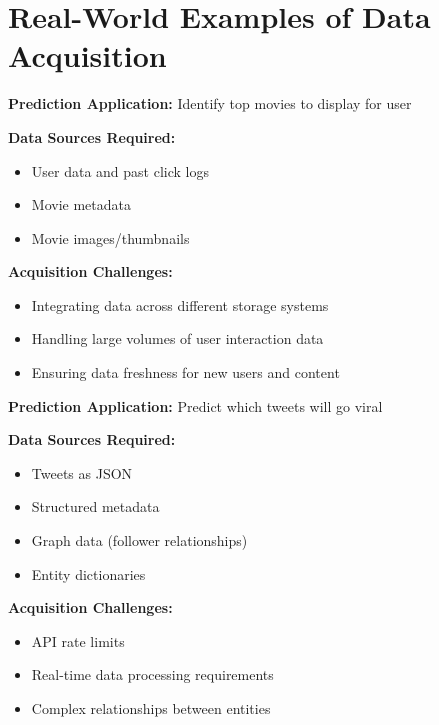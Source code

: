 \documentclass[12pt]{article}
\begin{document}
\section{Real-World Examples of Data Acquisition}

\begin{tcolorbox}[colback=blue!5!white,colframe=blue!75!black,title=Example: Recommendation System (e.g., Netflix)]
\textbf{Prediction Application:} Identify top movies to display for user

\textbf{Data Sources Required:}
\begin{itemize}
    \item User data and past click logs
    \item Movie metadata
    \item Movie images/thumbnails
\end{itemize}

\textbf{Acquisition Challenges:}
\begin{itemize}
    \item Integrating data across different storage systems
    \item Handling large volumes of user interaction data
    \item Ensuring data freshness for new users and content
\end{itemize}
\end{tcolorbox}

\begin{tcolorbox}[colback=blue!5!white,colframe=blue!75!black,title=Example: Social Media Analytics]
\textbf{Prediction Application:} Predict which tweets will go viral

\textbf{Data Sources Required:}
\begin{itemize}
    \item Tweets as JSON
    \item Structured metadata
    \item Graph data (follower relationships)
    \item Entity dictionaries
\end{itemize}

\textbf{Acquisition Challenges:}
\begin{itemize}
    \item API rate limits
    \item Real-time data processing requirements
    \item Complex relationships between entities
\end{itemize}
\end{tcolorbox}
\end{document}
